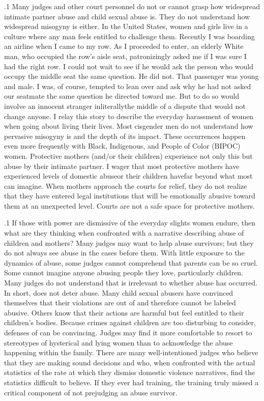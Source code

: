 \documentclass[11pt, twoside]{article}
\begin{document}
{\p.1{%
Many judges and other court personnel do not or cannot grasp how
widespread intimate partner abuse and child sexual abuse is. They do not
understand how widespread misogyny is either. In the United States, women
and girls live in a culture where any man feels entitled to challenge them.
Recently I was boarding an airline when I came to my row. As I proceeded to enter, an elderly White man, who occupied the row's aisle seat,
patronizingly asked me if I was sure I had the right row. I could not wait
to see if he would ask the person who would occupy the middle seat the
same question. He did not. That passenger was young and male. I was, of
course, tempted to lean over and ask why he had not asked our seatmate
the same question he directed toward me. But to do so would involve an
innocent stranger in\mdash{}literally\mdash{}the middle of a dispute that would not
change anyone. I relay this story to describe the everyday harassment of
women when going about living their lives. Most cisgender men do not
understand how pervasive misogyny is and the depth of its impact. These
occurrences happen even more frequently with Black, Indigenous, and
People of Color (BIPOC) women. Protective mothers (and/or their children) experience not only this  but abuse by their
intimate partner. I wager that most protective mothers have experienced
levels of domestic abuse\mdash{}or their children have\mdash{}far beyond what most
can imagine. When mothers approach the courts for relief, they do not
realize that they have entered legal institutions that will be emotionally
abusive toward them at an unexpected level. Courts are not a safe space
for protective mothers.
}%

\p.1{%
If those with power are dismissive of the everyday slights women endure, then what are they thinking when confronted with a narrative
describing abuse of children and mothers? Many judges may want to
help abuse survivors; but they do not always see abuse in the cases before
them. With little exposure to the dynamics of abuse, some judges cannot
comprehend that parents can be so cruel. Some cannot imagine anyone abusing people they love, particularly children. Many judges do not
understand that  is irrelevant to whether abuse has occurred. In
short,  does not deter abuse. Many child sexual abusers have convinced themselves that their violations are out of  and therefore
cannot be labeled abusive. Others know that their actions are harmful
but feel entitled to their children's bodies. Because crimes against children are too disturbing to consider, defenses of  can be convincing. Judges may find it more
comfortable to resort to stereotypes of hysterical and lying women than
to acknowledge the abuse happening within the family. There are many
well-intentioned judges who believe that they are making sound decisions and who, when confronted with the actual statistics of the rate at
which they dismiss domestic violence narratives, find the statistics difficult to believe. If they ever had training, the training truly missed a
critical component of not prejudging an abuse survivor.
}%

}
\end{document}
